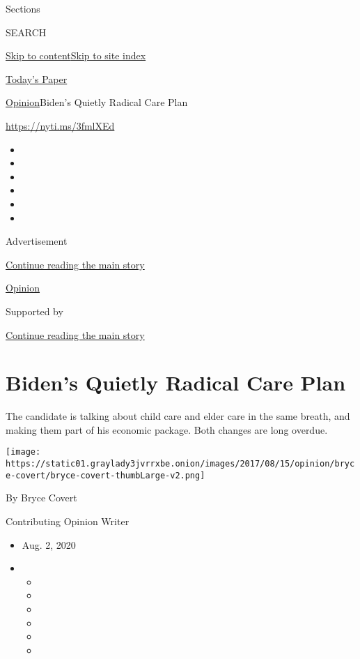 Sections

SEARCH

\protect\hyperlink{site-content}{Skip to
content}\protect\hyperlink{site-index}{Skip to site index}

\href{https://myaccount.nytimes3xbfgragh.onion/auth/login?response_type=cookie\&client_id=vi}{}

\href{https://www.nytimes3xbfgragh.onion/section/todayspaper}{Today's
Paper}

\href{/section/opinion}{Opinion}\textbar{}Biden's Quietly Radical Care
Plan

\url{https://nyti.ms/3fmlXEd}

\begin{itemize}
\item
\item
\item
\item
\item
\item
\end{itemize}

Advertisement

\protect\hyperlink{after-top}{Continue reading the main story}

\href{/section/opinion}{Opinion}

Supported by

\protect\hyperlink{after-sponsor}{Continue reading the main story}

\hypertarget{bidens-quietly-radical-care-plan}{%
\section{Biden's Quietly Radical Care
Plan}\label{bidens-quietly-radical-care-plan}}

The candidate is talking about child care and elder care in the same
breath, and making them part of his economic package. Both changes are
long overdue.

\texttt{[image: https://static01.graylady3jvrrxbe.onion/images/2017/08/15/opinion/bryce-covert/bryce-covert-thumbLarge-v2.png]}

By Bryce Covert

Contributing Opinion Writer

\begin{itemize}
\item
  Aug. 2, 2020
\item
  \begin{itemize}
  \item
  \item
  \item
  \item
  \item
  \item
  \end{itemize}
\end{itemize}

